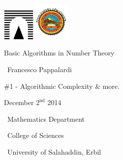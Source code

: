 \documentclass[landscape,handout]{powersem} %
\begin{document}

\begin{slide}
\includegraphics[width=1.6cm]{images/roma3.pdf}\hfill\includegraphics[width=1.9cm]{images/photo_erbil.jpg}
\vfill

\begin{center}\begin{sc}
\begin{Large}

\textcolor{underlcolor}{Basic Algorithms in Number Theory}
\end{Large}\bigskip

\ {Francesco Pappalardi}\bigskip\bigskip

\begin{large}\begin{bf}\#1 - Algorithmic Complexity \& more.
\end{bf}\end{large}\medskip

December $2^{\textrm{nd}}$ 2014\medskip
\vfil\end{sc}\end{center}
\begin{it}
\ \hfill Mathematics Department

\ \hfill College of Sciences

\ \hfill University of Salahaddin, Erbil
\end{it}

\vfill

\end{slide}
\end{document}
